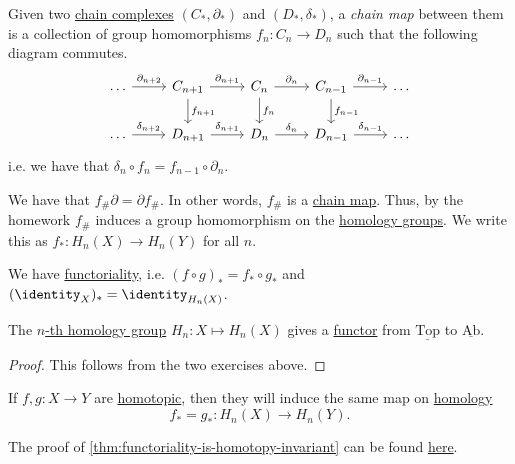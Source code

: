 \begin{definition}\label{def:chain-map}
	Given two \hyperref[def:chain-complex]{chain complexes} \((C_\ast, \partial_\ast)\) and \((D_\ast, \delta_\ast)\), a
	\emph{chain map} between them is a collection of group homomorphisms \(f_n \colon C_n \to D_n\) such that the following diagram commutes.
	\[
		\begin{tikzcd}
			\dots & {C_{n+1}} & {C_n} & {C_{n-1}} & \dots \\
			\dots & {D_{n+1}} & {D_n} & {D_{n-1}} & \dots
			\arrow["{\partial_{n+2}}", from=1-1, to=1-2]
			\arrow["{\delta_{n+2}}", from=2-1, to=2-2]
			\arrow["{\delta_{n+1}}", from=2-2, to=2-3]
			\arrow["{\delta_{n}}", from=2-3, to=2-4]
			\arrow["{\partial_{n-1}}", from=1-4, to=1-5]
			\arrow["{\partial_{n}}", from=1-3, to=1-4]
			\arrow["{\partial_{n+1}}", from=1-2, to=1-3]
			\arrow["{\delta_{n-1}}", from=2-4, to=2-5]
			\arrow["{f_{n-1}}", from=1-4, to=2-4]
			\arrow["{f_{n}}", from=1-3, to=2-3]
			\arrow["{f_{n+1}}", from=1-2, to=2-2]
		\end{tikzcd}
	\]
	i.e. we have that \(\delta_n \circ f_n = f_{n - 1} \circ \partial_n\).
\end{definition}

\begin{exercise}
	We have that \(f_{\#} \partial = \partial f_{\#}\). In other words, \(f_{\#}\) is a \hyperref[def:chain-map]{chain map}.
	Thus, by the homework \(f_{\#}\) induces a group homomorphism on the \hyperref[def:homology-group]{homology groups}. We write
	this as \(f_\ast \colon H_n(X) \to H_n(Y)\) for all \(n\).
\end{exercise}
\begin{exercise}
	We have \underline{functoriality}, i.e. \((f \circ g)_\ast = f_\ast \circ g_\ast\) and \((\identity_X)_\ast = \identity_{H_n(X)}\).
\end{exercise}

\begin{theorem}\label{thm:homology-group-defines-a-functor}
	The \hyperref[def:homology-group]{\(n\)-th homology group} \(H_n \colon X \mapsto H_n(X)\) gives a \hyperref[def:functor]{functor} from \(\underline{\mathrm{Top}}\)
	to \(\underline{\mathrm{Ab} }\).
\end{theorem}
\begin{proof}
	This follows from the two exercises above.
\end{proof}

\begin{theorem}\label{thm:functoriality-is-homotopy-invariant}
	If \(f, g\colon X \to Y\) are \hyperref[def:homotopic]{homotopic}, then they will induce the same map on \hyperref[def:homology-group]{homology}
	\[
		f_\ast = g_\ast \colon H_n(X) \to H_n(Y).
	\]
\end{theorem}
The proof of \autoref{thm:functoriality-is-homotopy-invariant} can be found \hyperref[pf:functoriality-is-homotopy-invariant]{here}.

